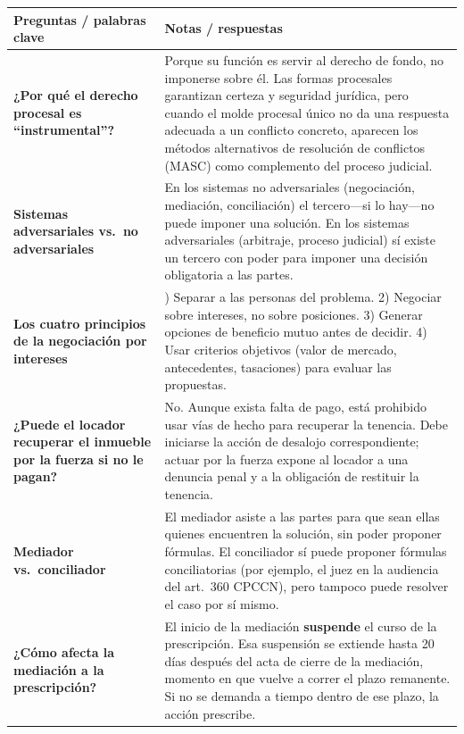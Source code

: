 \documentclass[12pt,oneside]{book}
\begin{document}
\begin{table}[H]
\centering
\begin{tabularx}{\textwidth}{
    >{\raggedright\arraybackslash}p{}
    >{\raggedright\arraybackslash}X
}
\toprule
\textbf{Preguntas / palabras clave} & \textbf{Notas / respuestas} \\
\midrule

\textbf{¿Por qué el derecho procesal es ``instrumental''?} &
Porque su función es servir al derecho de fondo, no imponerse
sobre él. Las formas procesales garantizan certeza y seguridad
jurídica, pero cuando el molde procesal único no da una respuesta
adecuada a un conflicto concreto, aparecen los métodos alternativos
de resolución de conflictos (MASC) como complemento del proceso
judicial. \\[0.4em]

\textbf{Sistemas adversariales vs.\ no adversariales} &
En los sistemas no adversariales (negociación, mediación,
conciliación) el tercero---si lo hay---no puede imponer una solución.
En los sistemas adversariales (arbitraje, proceso judicial) sí existe
un tercero con poder para imponer una decisión obligatoria a las
partes. \\[0.4em]

\textbf{Los cuatro principios de la negociación por intereses} &
1) Separar a las personas del problema. 2) Negociar sobre intereses,
no sobre posiciones. 3) Generar opciones de beneficio mutuo antes de
decidir. 4) Usar criterios objetivos (valor de mercado, antecedentes,
tasaciones) para evaluar las propuestas. \\[0.4em]

\textbf{¿Puede el locador recuperar el inmueble por la fuerza si no le pagan?} &
No. Aunque exista falta de pago, está prohibido usar vías de hecho
para recuperar la tenencia. Debe iniciarse la acción de desalojo
correspondiente; actuar por la fuerza expone al locador a una denuncia
penal y a la obligación de restituir la tenencia. \\[0.4em]

\textbf{Mediador vs.\ conciliador} &
El mediador asiste a las partes para que sean ellas quienes encuentren
la solución, sin poder proponer fórmulas. El conciliador sí puede
proponer fórmulas conciliatorias (por ejemplo, el juez en la audiencia
del art.\ 360 CPCCN), pero tampoco puede resolver el caso por sí
mismo. \\[0.4em]

\textbf{¿Cómo afecta la mediación a la prescripción?} &
El inicio de la mediación \textbf{suspende} el curso de la
prescripción. Esa suspensión se extiende hasta 20 días después del
acta de cierre de la mediación, momento en que vuelve a correr el
plazo remanente. Si no se demanda a tiempo dentro de ese plazo, la
acción prescribe. \\[0.4em]


\end{tabularx}
\end{table}
\end{document}
